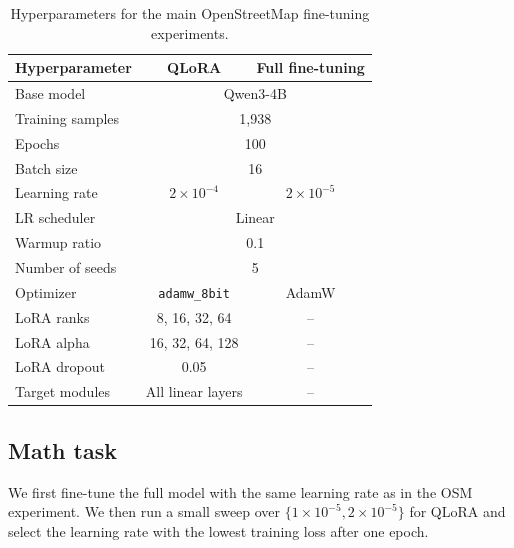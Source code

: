 \documentclass[11pt]{article}
\begin{document}
\begin{table}[h]
\centering
\small
\begin{tabular}{lcc}
\toprule
\textbf{Hyperparameter} & \textbf{QLoRA} & \textbf{Full fine-tuning} \\
\midrule
Base model & \multicolumn{2}{c}{Qwen3-4B} \\
Training samples & \multicolumn{2}{c}{1,938} \\
Epochs & \multicolumn{2}{c}{100} \\
Batch size & \multicolumn{2}{c}{16} \\
Learning rate & $2\times10^{-4}$ & $2\times10^{-5}$ \\
LR scheduler & \multicolumn{2}{c}{Linear} \\
Warmup ratio & \multicolumn{2}{c}{0.1} \\
Number of seeds & \multicolumn{2}{c}{5} \\
Optimizer & \texttt{adamw\_8bit} & AdamW \\
LoRA ranks & 8, 16, 32, 64 & -- \\
LoRA alpha & 16, 32, 64, 128 & -- \\
LoRA dropout & 0.05 & -- \\
Target modules & All linear layers & -- \\
\bottomrule
\end{tabular}
\caption{Hyperparameters for the main OpenStreetMap fine-tuning experiments.}
\label{tab:osm-hyperparameters}
\end{table}

\subsection{Math task}
\label{app:hyperparam-math}
We first fine-tune the full model with the same learning rate as in the OSM experiment.
We then run a small sweep over $\{1\times10^{-5}, 2\times10^{-5}\}$ for QLoRA
and select the learning rate with the lowest training loss after one epoch. 
\end{document}
